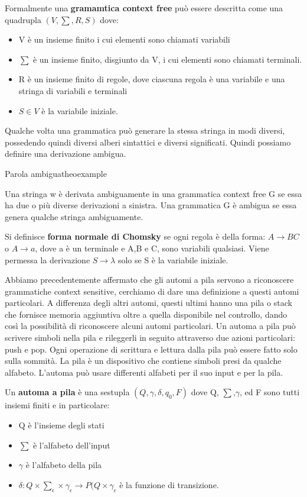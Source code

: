 \documentclass[a4paper]{extarticle}
\begin{document}
Formalmente una \textbf{gramamtica context free} può essere descritta come una quadrupla $(V,\sum,R,S)$ dove:
\begin{itemize}
\item V è un insieme finito i cui elementi sono chiamati variabili
\item $\sum$ è un insieme finito, disgiunto da V, i cui elementi sono chiamati terminali.
\item R è un insieme finito di regole, dove ciascuna regola è una variabile e una stringa di variabili e terminali
\item $S \in V$ è la variabile iniziale.
\end{itemize}

Qualche volta una grammatica può generare la stessa stringa in modi diversi, possedendo quindi diversi alberi sintattici e diversi significati. Quindi possiamo definire una derivazione ambigua.

\begin{definizione}{Parola ambigua}{theoexample}

Una stringa w è derivata ambiguamente in una grammatica context free G se essa ha due o più diverse derivazioni a sinistra. Una grammatica G è ambigua se essa genera qualche stringa ambiguamente.
\end {definizione}

Si definisce \textbf{forma normale di Chomsky} se ogni regola è della forma: $ A \rightarrow BC$ o $A\rightarrow a$, dove a è un terminale e A,B e C, sono variabili qualsiasi. Viene permessa la derivazione $S\rightarrow \lambda$ solo se S è la variabile iniziale.

Abbiamo precedentemente affermato che gli automi a pila servono a riconoscere grammatiche context sensitive, cerchiamo di dare una definizione a questi automi particolari. A differenza degli altri automi, questi ultimi hanno una pila o stack che fornisce memoria aggiuntiva oltre a quella disponibile nel controllo, dando così la possibilità di riconoscere alcuni automi particolari. Un automa a pila può scrivere simboli nella pila e rileggerli in seguito attraverso due azioni particolari: push e pop. Ogni operazione di scrittura e lettura dalla pila può essere fatto solo sulla sommità. La pila è un dispositivo che contiene simboli presi da qualche alfabeto. L'automa può usare differenti alfabeti per il suo input e per la pila.

Un \textbf{automa a pila} è una sestupla $(Q,\gamma,\delta,q_0,F)$ dove Q, $\sum$,$\gamma$, ed F sono tutti insiemi finiti e in particolare:
\begin{itemize}
\item Q è l'insieme degli stati
\item $\sum$ è l'alfabeto dell'input
\item $\gamma$ è l'alfabeto della pila
\item $\delta : Q \times\sum_{\epsilon}\times\gamma_{\epsilon} \longrightarrow P(Q\times \gamma_{\epsilon}$ è la funzione di transizione.
\end{itemize}
\end{document}
